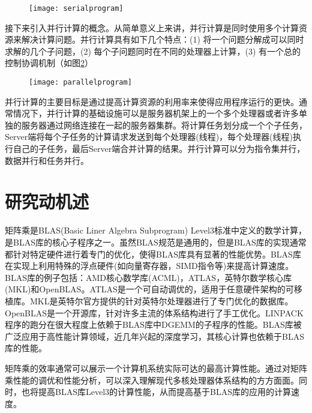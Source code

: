 \begin{figure}[!htbp]
	\centering
	\texttt{[image: serialprogram]}
	\label{fig:serialprogram}
\end{figure}

接下来引入并行计算的概念。从简单意义上来讲，并行计算是同时使用多个计算资源来解决计算问题。并行计算具有如下几个特点：(1) 将一个问题分解成可以同时求解的几个子问题，(2) 每个子问题同时在不同的处理器上计算，(3) 有一个总的控制协调机制（如图\ref{fig:parallelprogram}）

\begin{figure}[!htbp]
	\centering
	\texttt{[image: parallelprogram]}
	\label{fig:parallelprogram}
\end{figure}

并行计算的主要目标是通过提高计算资源的利用率来使得应用程序运行的更快。通常情况下，并行计算的基础设施可以是服务器机架上的一个多个处理器或者许多单独的服务器通过网络连接在一起的服务器集群。将计算任务划分成一个个子任务，Server端将每个子任务的计算请求发送到每个处理器(线程)，每个处理器(线程)执行自己的子任务，最后Server端合并计算的结果。并行计算可以分为指令集并行，数据并行和任务并行。


\section{研究动机述}
矩阵乘是BLAS(Basic Liner Algebra Subprogram) Level3标准中定义的数学计算，是BLAS库的核心子程序之一。虽然BLAS规范是通用的，但是BLAS库的实现通常都针对特定硬件进行着专门的优化，使得BLAS库具有显著的性能优势。BLAS库在实现上利用特殊的浮点硬件(如向量寄存器，SIMD指令等)来提高计算速度。BLAS库的例子包括：AMD核心数学库(ACML)，ATLAS，英特尔数学核心库(MKL)和OpenBLAS。ATLAS是一个可自动调优的，适用于任意硬件架构的可移植库。MKL是英特尔官方提供的针对英特尔处理器进行了专门优化的数据库。OpenBLAS是一个开源库，针对许多主流的体系结构进行了手工优化。LINPACK程序的跑分在很大程度上依赖于BLAS库中DGEMM的子程序的性能。BLAS库被广泛应用于高性能计算领域，近几年兴起的深度学习，其核心计算也依赖于BLAS库的性能。

矩阵乘的效率通常可以展示一个计算机系统实际可达的最高计算性能。通过对矩阵乘性能的调优和性能分析，可以深入理解现代多核处理器体系结构的方方面面。同时，也将提高BLAS库Level3的计算性能，从而提高基于BLAS库的应用的计算速度。


